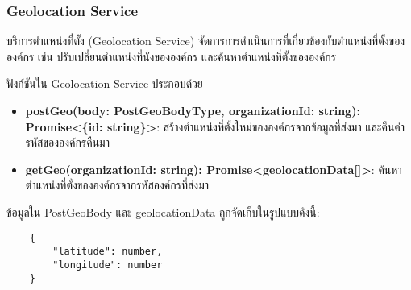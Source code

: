 \subsubsection{Geolocation Service}
\ifenglish
\else
บริการตำแหน่งที่ตั้ง (Geolocation Service) จัดการการดำเนินการที่เกี่ยวข้องกับตำแหน่งที่ตั้งขององค์กร เช่น ปรับเปลี่ยนตำแหน่งที่นั่งขององค์กร และค้นหาตำแหน่งที่ตั้งขององค์กร

ฟังก์ชันใน Geolocation Service ประกอบด้วย
\begin{itemize}
    \item \textbf{postGeo(body: PostGeoBodyType, organizationId: string): Promise<\{id: string\}>}: สร้างตำแหน่งที่ตั้งใหม่ขององค์กรจากข้อมูลที่ส่งมา และคืนค่ารหัสขององค์กรคืนมา
    \item \textbf{getGeo(organizationId: string): Promise<geolocationData[]>}: ค้นหาตำแหน่งที่ตั้งขององค์กรจากรหัสองค์กรที่ส่งมา
\end{itemize}

ข้อมูลใน PostGeoBody และ geolocationData ถูกจัดเก็บในรูปแบบดังนี้:
\begin{lstlisting}
    {
        "latitude": number, 
        "longitude": number
    }
\end{lstlisting}
\fi